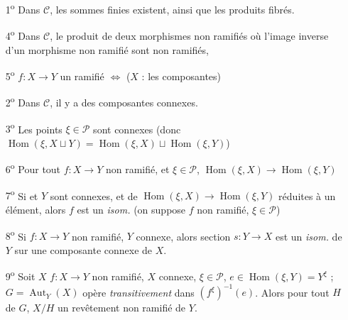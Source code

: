 \documentclass[11pt,a4paper]{article}
\begin{document}
\begin{enumerate}
\item[1\textsuperscript{o}] Dans $\mathcal{C}$, les sommes finies existent,
ainsi que les produits fibrés.

\item[4\textsuperscript{o}] Dans $\mathcal{C}$, le  produit de
deux morphismes non ramifiés  où l'image
inverse d'un morphisme non ramifié sont non ramifiés, \ill{}

\item[5\textsuperscript{o}] \struck{\ill{}} $f : X \to Y$  un
\ill{} ramifié $\Longleftrightarrow$ \ill{} ($X$ : les composantes) \ill{}
 \ill{}

\item[2\textsuperscript{o}] Dans $\mathcal{C}$, il y a des composantes connexes.

\item[3\textsuperscript{o}] Les points $\xi \in \mathcal{P}$ sont connexes
(donc $\operatorname{Hom}(\xi, X \sqcup Y) = \operatorname{Hom}(\xi, X) \sqcup
\operatorname{Hom}(\xi, Y)$)

\item[6\textsuperscript{o}] Pour tout $f : X \to Y$ non ramifié,
 et $\xi \in \mathcal{P}$,
$\operatorname{Hom}(\xi, X) \to \operatorname{Hom}(\xi, Y)$ \ill{}

\item[7\textsuperscript{o}] Si  et $Y$ sont connexes, et
 de $\operatorname{Hom}(\xi, X) \to
\operatorname{Hom}(\xi, Y)$  \ill{}
réduites à un élément, alors $f$ est un \emph{isom.}
(on suppose $f$ non ramifié, $\xi \in \mathcal{P}$)

\item[8\textsuperscript{o}] Si $f : X \to Y$ non ramifié, $Y$ connexe, alors
  section $s : Y \to X$ est un \emph{isom.} de
$Y$ sur une composante connexe de $X$.

\item[9\textsuperscript{o}] Soit  
 $X$ \ill{} \ill{} $f : X \to Y$ non ramifié,
\struck{\ill{}} $X$ connexe, $\xi \in \mathcal{P}$,
$e \in \operatorname{Hom}(\xi, Y) = Y^{\xi}$ ; \ill{}
$G = \operatorname{Aut}_Y(X)$ opère \emph{transitivement} dans
$(f^{\xi})^{-1}(e)$. Alors pour tout
 $H$ de $G$, $X/H$ \ill{} 
\ill{} un revêtement non ramifié de $Y$. \struck{\ill{}}
\end{enumerate}
\end{document}
